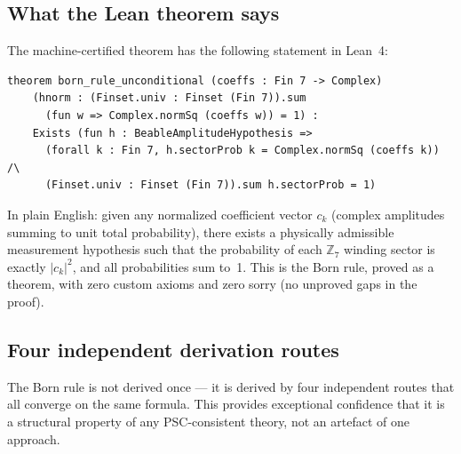 \documentclass[11pt,a4paper]{article}
\newcommand{\lean}[1]{\texttt{#1}}
\begin{document}
\subsection{What the Lean theorem says}

The machine-certified theorem has the following statement in Lean~4:

\begin{tcolorbox}[colback=gray!8,colframe=gray!40,
  title={Lean 4: \lean{born\_rule\_unconditional} (exact statement)},breakable]
\begin{verbatim}
theorem born_rule_unconditional (coeffs : Fin 7 -> Complex)
    (hnorm : (Finset.univ : Finset (Fin 7)).sum
      (fun w => Complex.normSq (coeffs w)) = 1) :
    Exists (fun h : BeableAmplitudeHypothesis =>
      (forall k : Fin 7, h.sectorProb k = Complex.normSq (coeffs k)) /\
      (Finset.univ : Finset (Fin 7)).sum h.sectorProb = 1)
\end{verbatim}
\end{tcolorbox}

\noindent
In plain English: given any normalized coefficient vector $c_k$ (complex amplitudes
summing to unit total probability), there exists a physically admissible measurement
hypothesis such that the probability of each $\mathbb{Z}_7$ winding sector is exactly
$|c_k|^2$, and all probabilities sum to~1.  This is the Born rule, proved as a theorem,
with zero custom axioms and zero sorry (no unproved gaps in the proof).

\subsection{Four independent derivation routes}

The Born rule is not derived once --- it is derived by four independent routes that all
converge on the same formula.  This provides exceptional confidence that it is a
structural property of any PSC-consistent theory, not an artefact of one approach.
\end{document}
